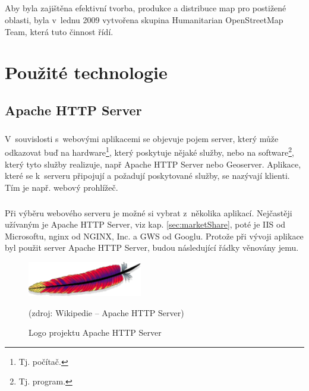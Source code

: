 \documentclass[11pt,a4paper,titlepage,oneside]{book}
\begin{document}
		\paragraph{} Aby byla zajištěna efektivní tvorba, produkce a distribuce map pro postižené oblasti, byla v~lednu 2009 vytvořena skupina Humanitarian OpenStreetMap Team\cite{wiki_hot}, která tuto činnost řídí.
	

\chapter{Použité technologie}

	\section{Apache HTTP Server}



		\paragraph{}\label{sec:server} V~souvislosti s~webovými aplikacemi se objevuje pojem server, který může odkazovat buď na hardware\footnote{Tj. počítač.}, který poskytuje nějaké služby, nebo na software\footnote{Tj. program.}, který tyto služby realizuje, např Apache HTTP Server nebo Geoserver. Aplikace, které se k~serveru připojují a požadují poskytované služby, se nazývají klienti\label{sec:klient}. Tím je např. webový prohlížeč.
		\paragraph{} Při výběru webového serveru je možné si vybrat z~několika aplikací. Nej\-častěji užívaným je Apache HTTP Server, viz kap. \ref{sec:marketShare}, poté je IIS od Microsoftu, nginx od NGINX, Inc. a GWS od Googlu. Protože při vývoji aplikace byl použit server Apache HTTP Server, budou následující řádky věnovány jemu.
		\begin{figure}[!h]
			\begin{center}
				\includegraphics[width=5cm]{obrazky/apacheLogo.png}
				\caption{Logo projektu Apache HTTP Server}
				(zdroj: Wikipedie -- Apache HTTP Server\cite{wiki-Apache})
			\end{center}
		\end{figure}
\end{document}

